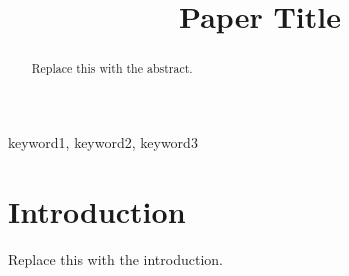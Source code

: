 \documentclass[conference]{IEEEtran}
\title{Paper Title}
\author{
  \IEEEauthorblockN{Author Name}
  \IEEEauthorblockA{Affiliation\\
  email@example.com}
}
\begin{document}
\maketitle

\begin{abstract}
Replace this with the abstract.
\end{abstract}

\begin{IEEEkeywords}
keyword1, keyword2, keyword3
\end{IEEEkeywords}

\section{Introduction}
Replace this with the introduction.

% 
% 
\end{document}
